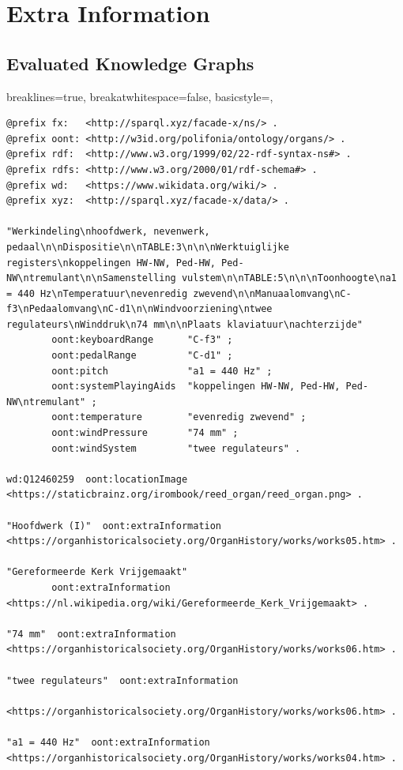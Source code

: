 \chapter{Extra Information}
\section{Evaluated Knowledge Graphs}
\lstset
{
    breaklines=true,
    breakatwhitespace=false,
    basicstyle=\linespread{1}\ttfamily,
}
\begin{lstlisting}[caption={Part14\_000Brouwershaven}]
@prefix fx:   <http://sparql.xyz/facade-x/ns/> .
@prefix oont: <http://w3id.org/polifonia/ontology/organs/> .
@prefix rdf:  <http://www.w3.org/1999/02/22-rdf-syntax-ns#> .
@prefix rdfs: <http://www.w3.org/2000/01/rdf-schema#> .
@prefix wd:   <https://www.wikidata.org/wiki/> .
@prefix xyz:  <http://sparql.xyz/facade-x/data/> .

"Werkindeling\nhoofdwerk, nevenwerk, pedaal\n\nDispositie\n\nTABLE:3\n\n\nWerktuiglijke registers\nkoppelingen HW-NW, Ped-HW, Ped-NW\ntremulant\n\nSamenstelling vulstem\n\nTABLE:5\n\n\nToonhoogte\na1 = 440 Hz\nTemperatuur\nevenredig zwevend\n\nManuaalomvang\nC-f3\nPedaalomvang\nC-d1\n\nWindvoorziening\ntwee regulateurs\nWinddruk\n74 mm\n\nPlaats klaviatuur\nachterzijde"
        oont:keyboardRange      "C-f3" ;
        oont:pedalRange         "C-d1" ;
        oont:pitch              "a1 = 440 Hz" ;
        oont:systemPlayingAids  "koppelingen HW-NW, Ped-HW, Ped-NW\ntremulant" ;
        oont:temperature        "evenredig zwevend" ;
        oont:windPressure       "74 mm" ;
        oont:windSystem         "twee regulateurs" .

wd:Q12460259  oont:locationImage  <https://staticbrainz.org/irombook/reed_organ/reed_organ.png> .

"Hoofdwerk (I)"  oont:extraInformation  <https://organhistoricalsociety.org/OrganHistory/works/works05.htm> .

"Gereformeerde Kerk Vrijgemaakt"
        oont:extraInformation  <https://nl.wikipedia.org/wiki/Gereformeerde_Kerk_Vrijgemaakt> .

"74 mm"  oont:extraInformation  <https://organhistoricalsociety.org/OrganHistory/works/works06.htm> .

"twee regulateurs"  oont:extraInformation
                <https://organhistoricalsociety.org/OrganHistory/works/works06.htm> .

"a1 = 440 Hz"  oont:extraInformation  <https://organhistoricalsociety.org/OrganHistory/works/works04.htm> .


\end{lstlisting}
